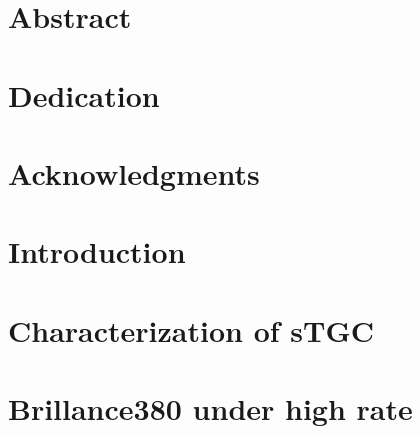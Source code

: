








\chapter*{Abstract}



\chapter*{Dedication}


\chapter*{Acknowledgments}


\tableofcontents


\chapter{Introduction}



\chapter{Characterization of sTGC}



\chapter{Brillance380 under high rate}



